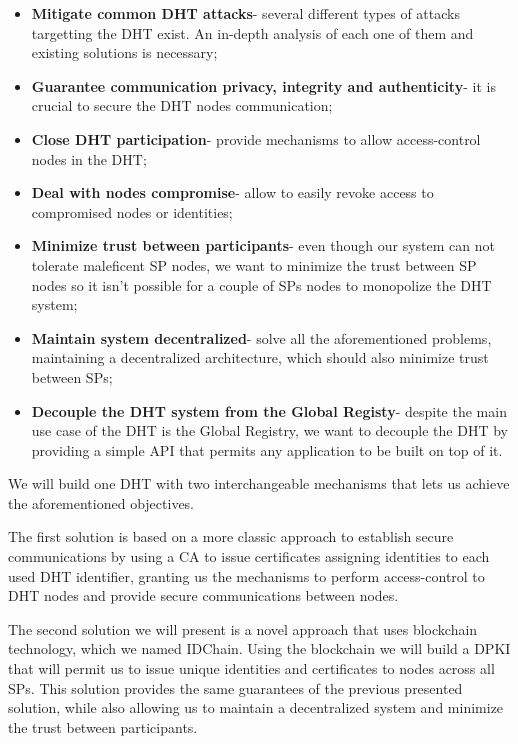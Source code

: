 \begin{itemize}
  \item \textbf{Mitigate common \ac{DHT} attacks}- several different types of attacks targetting the \ac{DHT} exist. An in-depth analysis of each one of them and existing solutions is necessary;
	\item \textbf{Guarantee communication privacy, integrity and authenticity}- it is crucial to secure the \ac{DHT} nodes communication;
	\item \textbf{Close DHT participation}- provide mechanisms to allow access-control nodes in the \ac{DHT};
	\item \textbf{Deal with nodes compromise}- allow to easily revoke access to compromised nodes or identities;
  \item \textbf{Minimize trust between participants}- even though our system can not tolerate maleficent \ac{SP} nodes, we want to minimize the trust between \ac{SP} nodes so it isn't possible for a couple of \acp{SP} nodes to monopolize the DHT system;
  \item \textbf{Maintain system decentralized}- solve all the aforementioned problems, maintaining a decentralized architecture, which should also minimize trust between \acp{SP};
  \item \textbf{Decouple the DHT system from the Global Registy}- despite the main use case of the DHT is the Global Registry, we want to decouple the DHT by providing a simple \ac{API} that permits any application to be built on top of it.
\end{itemize}

We will build one DHT with two interchangeable mechanisms that lets us achieve the aforementioned objectives.

The first solution is based on a more classic approach to establish secure communications by using a \acl{CA} to issue certificates assigning identities to each used DHT identifier, granting us the mechanisms to perform access-control to \ac{DHT} nodes and provide secure communications between nodes.

The second solution we will present is a novel approach that uses blockchain technology, which we named IDChain.
Using the blockchain we will build a \ac{DPKI} that will permit us to issue unique identities and certificates to nodes across all \acp{SP}.
This solution provides the same guarantees of the previous presented solution, while also allowing us to maintain a decentralized system and minimize the trust between participants.


